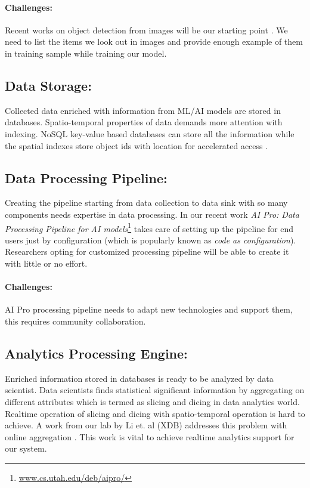 \vspace{-2mm}
\paragraph{Challenges:}
Recent works on object detection from images will be our starting point \cite{girshick2014rich, mao2014deep}. We need to list the items we look out in images and provide enough example of them in training sample while training our model.


\subsection{Data Storage:}
Collected data enriched with information from ML/AI models are stored in databases. Spatio-temporal properties of data demands more attention with indexing. NoSQL key-value based databases can store all the information while the spatial indexes store object ids with location for accelerated access \cite{christensen2015storm}.

\subsection{Data Processing Pipeline:}
Creating the pipeline starting from data collection to data sink with so many components needs expertise in data processing. In our recent work {\em AI Pro: Data Processing Pipeline for AI models}\footnote{\href{http://www.cs.utah.edu/~deb/aipro/}{www.cs.utah.edu/deb/aipro/}} takes care of setting up the pipeline for end users just by configuration (which is popularly known as {\em code as configuration}).
Researchers opting for customized processing pipeline will be able to create it with little or no effort.

\vspace{-2mm}
\paragraph{Challenges:}
AI Pro processing pipeline needs to adapt new technologies and support them, this requires community collaboration.

\subsection{Analytics Processing Engine:}
Enriched information stored in databases is ready to be analyzed by data scientist. Data scientists finds  statistical significant information by aggregating on different attributes which is termed as slicing and dicing in data analytics world. Realtime operation of slicing and dicing with spatio-temporal operation is hard to achieve. A work from our lab by Li et. al (XDB) addresses this problem with online aggregation \cite{li2017wander}. This work is vital to achieve realtime analytics support for our system.


